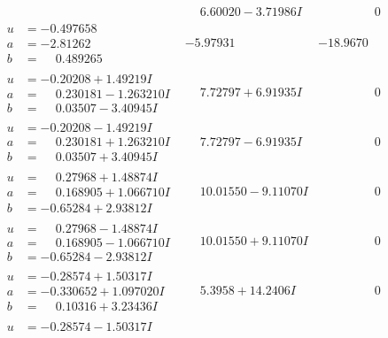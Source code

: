 \documentclass[1p]{elsarticle_modified}
\theoremstyle{definition}
\begin{document}
$$\begin{array}{c|c|c}
 & \phantom{-}6.60020 - 3.71986 I & \phantom{-0.000000 } 0 \\ \hline\begin{aligned}
u &= -0.497658\phantom{ +0.000000I} \\
a &= -2.81262\phantom{ +0.000000I} \\
b &= \phantom{-}0.489265\phantom{ +0.000000I}\end{aligned}
 & -5.97931\phantom{ +0.000000I} & -18.9670\phantom{ +0.000000I} \\ \hline\begin{aligned}
u &= -0.20208 + 1.49219 I \\
a &= \phantom{-}0.230181 - 1.263210 I \\
b &= \phantom{-}0.03507 - 3.40945 I\end{aligned}
 & \phantom{-}7.72797 + 6.91935 I & \phantom{-0.000000 } 0 \\ \hline\begin{aligned}
u &= -0.20208 - 1.49219 I \\
a &= \phantom{-}0.230181 + 1.263210 I \\
b &= \phantom{-}0.03507 + 3.40945 I\end{aligned}
 & \phantom{-}7.72797 - 6.91935 I & \phantom{-0.000000 } 0 \\ \hline\begin{aligned}
u &= \phantom{-}0.27968 + 1.48874 I \\
a &= \phantom{-}0.168905 + 1.066710 I \\
b &= -0.65284 + 2.93812 I\end{aligned}
 & \phantom{-}10.01550 - 9.11070 I & \phantom{-0.000000 } 0 \\ \hline\begin{aligned}
u &= \phantom{-}0.27968 - 1.48874 I \\
a &= \phantom{-}0.168905 - 1.066710 I \\
b &= -0.65284 - 2.93812 I\end{aligned}
 & \phantom{-}10.01550 + 9.11070 I & \phantom{-0.000000 } 0 \\ \hline\begin{aligned}
u &= -0.28574 + 1.50317 I \\
a &= -0.330652 + 1.097020 I \\
b &= \phantom{-}0.10316 + 3.23436 I\end{aligned}
 & \phantom{-}5.3958 + 14.2406 I & \phantom{-0.000000 } 0 \\ \hline\begin{aligned}
u &= -0.28574 - 1.50317 I \\

\end{aligned}
\end{array}$$
\end{document}
